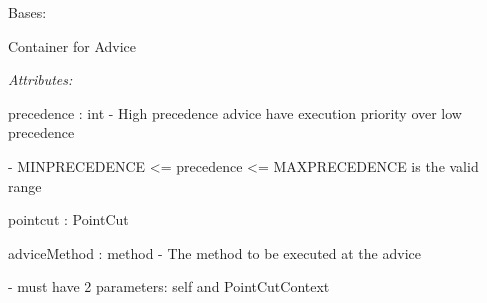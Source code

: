 \documentclass[letterpaper,10pt,english]{sphinxmanual}
\begin{document}
\begin{fulllineitems}
\label{modules/index:aosb.core.Advice}
Bases: 

Container for Advice

\begin{DUlineblock}{0em}
\item[] \emph{Attributes:}
\item[]
\begin{DUlineblock}{\DUlineblockindent}
\item[] precedence : int - High precedence advice have execution priority over low precedence
\item[]
\begin{DUlineblock}{\DUlineblockindent}
\item[] - MINPRECEDENCE \textless{}= precedence \textless{}= MAXPRECEDENCE is the valid range
\end{DUlineblock}
\item[] pointcut : PointCut
\item[] adviceMethod : method - The method to be executed at the advice
\item[]
\begin{DUlineblock}{\DUlineblockindent}
\item[] - must have 2 parameters: self and PointCutContext
\end{DUlineblock}
\end{DUlineblock}
\end{DUlineblock}

\begin{fulllineitems}
\label{modules/index:aosb.core.Advice.MAXPRECEDENCE}
\end{fulllineitems}


\begin{fulllineitems}
\label{modules/index:aosb.core.Advice.MINPRECEDENCE}
\end{fulllineitems}


\end{fulllineitems}

\end{document}
